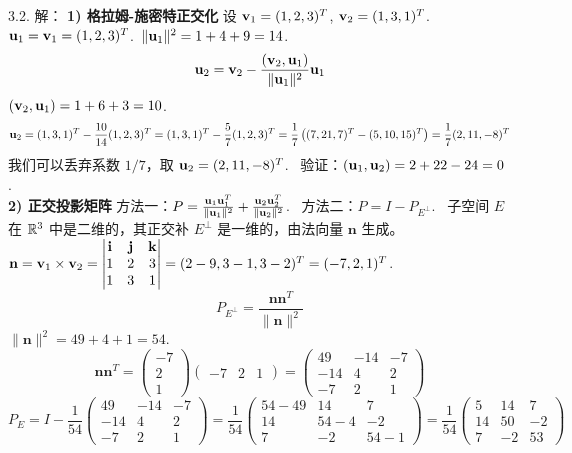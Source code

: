 \begin{exer}
3.2. 解：
\textbf{1) 格拉姆-施密特正交化}
设 $\mathbf{v}_1 = (1, 2, 3)^T$, $\mathbf{v}_2 = (1, 3, 1)^T$.~
$\mathbf{u}_1 = \mathbf{v}_1 = (1, 2, 3)^T$.~$\|\mathbf{u}_1\|^2 = 1 + 4 + 9 = 14$.~
$$ \mathbf{u}_2 = \mathbf{v}_2 - \frac{(\mathbf{v}_2, \mathbf{u}_1)}{\|\mathbf{u}_1\|^2} \mathbf{u}_1 $$
$(\mathbf{v}_2, \mathbf{u}_1) = 1 + 6 + 3 = 10$.~
$$ \mathbf{u}_2 = (1, 3, 1)^T - \frac{10}{14} (1, 2, 3)^T = (1, 3, 1)^T - \frac{5}{7} (1, 2, 3)^T = \frac{1}{7} \left( (7, 21, 7)^T - (5, 10, 15)^T \right) = \frac{1}{7} (2, 11, -8)^T $$
我们可以丢弃系数 $1/7$，取 $\mathbf{u}_2 = (2, 11, -8)^T$.~
验证：$(\mathbf{u}_1, \mathbf{u}_2) = 2 + 22 - 24 = 0$.~
\\
\textbf{2) 正交投影矩阵}
方法一：$P = \frac{\mathbf{u}_1 \mathbf{u}_1^T}{\|\mathbf{u}_1\|^2} + \frac{\mathbf{u}_2 \mathbf{u}_2^T}{\|\mathbf{u}_2\|^2}$.~
方法二：$P = I - P_{E^\perp}$.~
子空间 $E$ 在 $\mathbb{R}^3$ 中是二维的，其正交补 $E^\perp$ 是一维的，由法向量 $\mathbf{n}$ 生成。
$\mathbf{n} = \mathbf{v}_1 \times \mathbf{v}_2 = \begin{vmatrix} \mathbf{i} & \mathbf{j} & \mathbf{k} \\ 1 & 2 & 3 \\ 1 & 3 & 1 \end{vmatrix} = (2-9, 3-1, 3-2)^T = (-7, 2, 1)^T$.~
$$ P_{E^\perp} = \frac{\mathbf{n}\mathbf{n}^T}{\|\mathbf{n}\|^2} $$
$\|\mathbf{n}\|^2 = 49 + 4 + 1 = 54$.~
$$ \mathbf{n}\mathbf{n}^T = \begin{pmatrix} -7 \\ 2 \\ 1 \end{pmatrix} \begin{pmatrix} -7 & 2 & 1 \end{pmatrix} = \begin{pmatrix} 49 & -14 & -7 \\ -14 & 4 & 2 \\ -7 & 2 & 1 \end{pmatrix} $$
$$ P_E = I - \frac{1}{54} \begin{pmatrix} 49 & -14 & -7 \\ -14 & 4 & 2 \\ -7 & 2 & 1 \end{pmatrix} = \frac{1}{54} \begin{pmatrix} 54-49 & 14 & 7 \\ 14 & 54-4 & -2 \\ 7 & -2 & 54-1 \end{pmatrix} = \frac{1}{54} \begin{pmatrix} 5 & 14 & 7 \\ 14 & 50 & -2 \\ 7 & -2 & 53 \end{pmatrix} $$


\end{exer}
